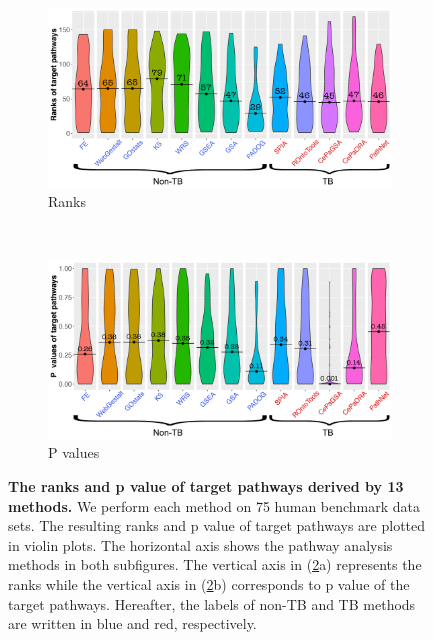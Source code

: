 \documentclass[Minh_PhD_thesis.tex]{subfiles}
\begin{document}
\begin{figure} [!t]
        \begin{subfigure}[h]{0.99\textwidth}
                \includegraphics[width=0.98\linewidth]{../Figures/Rank_individual}
                  \caption{Ranks}
                \label{rankCom}
        \end{subfigure}\\
        \begin{subfigure}[h]{0.991\textwidth}
                \includegraphics[width=0.98\linewidth]{../Figures/Pvalue_individual}
                \caption{P values}
        \end{subfigure}
        \caption{\textbf{The ranks and p value of target pathways derived by 13 methods.} We perform each method on 75 human benchmark data sets. The resulting ranks and p value of target pathways are plotted in violin plots. The horizontal axis shows the pathway analysis methods in both subfigures. The vertical axis in (\ref{overview}a) represents the ranks while the vertical axis in (\ref{overview}b) corresponds to p value of the target pathways. Hereafter, the labels of non-TB and TB methods are written in blue and red, respectively.}
        \label{overview}
\end{figure}
\end{document}
